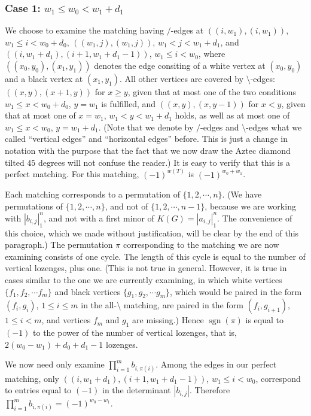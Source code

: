 \documentclass[10pt,reqno]{amsart}
\theoremstyle{plain}
\theoremstyle{definition}
\theoremstyle{remark}
\def\determinant#1{\left|#1\right|}
\DeclareMathOperator{\sgn }{sgn }
\begin{document}
\subsubsection{Case 1: $w_1\leq w_0<w_1+d_1$}

We choose to examine the matching having $/$-edges at
$((i,w_1),(i,w_1))$, $w_1\leq i< w_0+d_0$, $((w_1,j),(w_1,j))$,
$w_1< j < w_1+d_1$, and $((i,w_1+d_1),(i+1,w_1+d_1-1))$, 
$w_1\leq i < w_0$, where $((x_0,y_0),(x_1,y_1))$ denotes the
edge consiting of a white vertex at $(x_0,y_0)$ and a black vertex
at $(x_1,y_1)$. All other vertices are covered by $\setminus$-edges:
$((x,y),(x+1,y))$ for $x\geq y$, given that at most one of the two
conditions $w_1\leq x <w_0+d_0$, $y = w_1$ is fulfilled, and
$((x,y),(x,y-1))$ for $x<y$, given that at most one of 
$x = w_1$, $w_1< y <w_1+d_1$ holds, as well as at most one of
$w_1\leq x < w_0$, $y = w_1+d_1$. (Note that we denote by
$/$-edges and $\setminus$-edges what we called ``vertical edges'' and
``horizontal edges'' before. This is just a change in notation with 
the purpose that the fact that we now draw the Aztec diamond tilted
$45$ degrees will not confuse the reader.)
It is easy to verify that this
is a perfect matching. For this matching, $(-1)^{w(T)}$ is 
$(-1)^{w_0+w_1}$. 

Each matching corresponds to a permutation of $\{1,2,\dotsb , n\}$.
(We have permutations of $\{1,2,\dotsb , n\}$, and not of 
$\{1,2,\dotsb , n-1\}$, because we are working with 
$\determinant{b_{i,j}}_1^n$, and not with a first minor of
$K(G)=\determinant{a_{i,j}}_1^n$. The convenience of this choice,
which we made without justification, will be clear by the end of this
paragraph.) The permutation $\pi$ corresponding
to the matching we are now examining consists of one cycle.
The length of this cycle is equal to the number of vertical lozenges, plus 
one.
(This is not true in general. However, it is
true in cases similar to the one we are currently examining, in which
white vertices $\{ f_1,f_2,\dotsb f_m\} $ and
black vertices $\{ g_1,g_2,\dotsb g_m\} $, which would be paired
in the form $(f_i,g_i)$, $1\leq i\leq m$ in the all-$\setminus$  matching, are
paired in the form $(f_i,g_{i+1})$, $1\leq i<m$, and vertices
$f_m$ and $g_1$ are missing.) Hence $\sgn(\pi)$ is equal to $(-1)$
to the power of the number of vertical lozenges, that is, 
$2(w_0-w_1)+d_0+d_1-1$ lozenges.

We now need only examine $\prod_{i=1}^m b_{i,\pi(i)}$. Among the edges
in our perfect matching, only $((i,w_1+d_1),(i+1,w_1+d_1-1))$,
$w_1\leq i<w_0$, correspond to entries equal to $(-1)$ in the determinant
$\determinant{b_{i,j}}$. Therefore $\prod_{i=1}^m b_{i,\pi(i)} = (-1)^{w_0-w_1}$.
\end{document}
